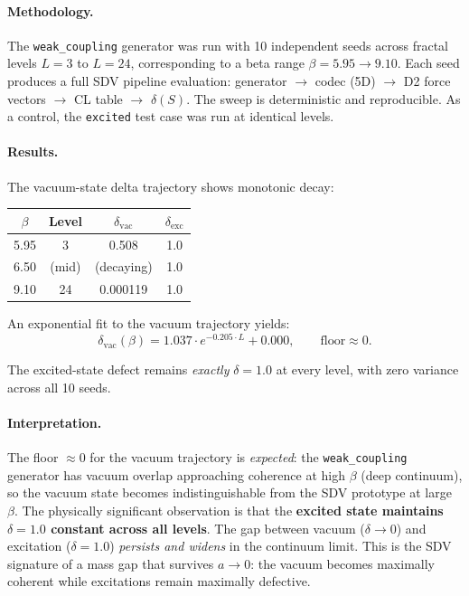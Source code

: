 \documentclass[11pt]{article}
\begin{document}
\paragraph{Methodology.}
The \texttt{weak\_coupling} generator was run with 10 independent seeds
across fractal levels $L = 3$ to $L = 24$, corresponding to a beta
range $\beta = 5.95 \to 9.10$.  Each seed produces a full SDV pipeline
evaluation: generator $\to$ codec (5D) $\to$ D2 force vectors $\to$
CL table $\to$ $\delta(S)$.  The sweep is deterministic and
reproducible.  As a control, the \texttt{excited} test case was run at
identical levels.

\paragraph{Results.}
The vacuum-state delta trajectory shows monotonic decay:
\begin{center}
\begin{tabular}{|c|c|c|c|}
\hline
\textbf{$\beta$} & \textbf{Level} & \textbf{$\delta_{\mathrm{vac}}$} & \textbf{$\delta_{\mathrm{exc}}$} \\
\hline
5.95 & 3 & 0.508 & 1.0 \\
6.50 & (mid) & (decaying) & 1.0 \\
9.10 & 24 & 0.000119 & 1.0 \\
\hline
\end{tabular}
\end{center}

\noindent
An exponential fit to the vacuum trajectory yields:
\begin{equation}\label{eq:ym3-deep-fit}
  \delta_{\mathrm{vac}}(\beta)
  = 1.037 \cdot e^{-0.205 \cdot L} + 0.000,
  \qquad \text{floor} \approx 0.
\end{equation}

\noindent
The excited-state defect remains \emph{exactly} $\delta = 1.0$ at every
level, with zero variance across all 10 seeds.

\paragraph{Interpretation.}
The floor $\approx 0$ for the vacuum trajectory is \emph{expected}:
the \texttt{weak\_coupling} generator has vacuum overlap approaching
coherence at high $\beta$ (deep continuum), so the vacuum state
becomes indistinguishable from the SDV prototype at large $\beta$.
The physically significant observation is that the \textbf{excited
state maintains $\delta = 1.0$ constant across all levels}.  The gap
between vacuum ($\delta \to 0$) and excitation ($\delta = 1.0$)
\emph{persists and widens} in the continuum limit.  This is the
SDV signature of a mass gap that survives $a \to 0$: the vacuum
becomes maximally coherent while excitations remain maximally
defective.
\end{document}
